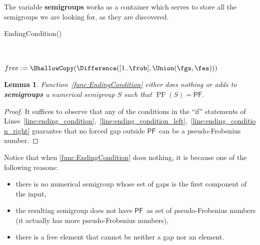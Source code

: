 \documentclass[11pt]{amsart}
\newtheorem{lemma}[theorem]{Lemma}
\theoremstyle{remark}
\begin{document}
The variable \textbf{semigroups} works as a container which serves to store all the semigroups we are looking for, as they are discovered. 
\begin{function}[ht]\caption{EndingCondition()\label{func:EndingCondition}}
\EndingConditionw{\fgs,\fes}\\
\\
    $free := \ShallowCopy(\Difference([1..\frob],\Union(\fgs,\fes)))$\;
\nl\label{line:range}     

\nl\label{line:one_free}     
\end{function}
\begin{lemma}\label{lemma:ending_condition}
Function~\ref{func:EndingCondition} either does nothing or adds to \textbf{semigroups} a numerical semigroup $S$ such that $\operatorname{PF}(S)={\ensuremath{\mathsf{PF}}}$.
\end{lemma}
\begin{proof}
It suffices to observe that any of the conditions in the ``if'' statements of Lines~\ref{line:ending_condition},~\ref{line:ending_condition_left},~\ref{line:ending_condition_right} guarantee that no forced gap outside {\ensuremath{\mathsf{PF}}}\ can be a pseudo-Frobenius number.
\end{proof}
Notice that when \ref{func:EndingCondition} does nothing, it is because  one of the following reasons:
\begin{itemize}
\item there is no numerical semigroup whose set of gaps is the first component of the input,
\item the resulting semigroup does not have {\ensuremath{\mathsf{PF}}}\ as set of pseudo-Frobenius numbers (it actually has more pseudo-Frobenius numbers), 
\item there is a free element that cannot be neither a gap nor an element.
\end{itemize}
\end{document}

